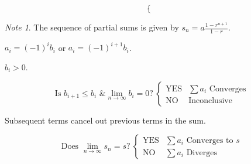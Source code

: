 \documentclass{article}
\theoremstyle{plain}
\numberwithin{theorem}{subsection}
\theoremstyle{definition}
\numberwithin{definition}{subsection}
\theoremstyle{remark}
\newtheorem{note}{Note}[section]
\numberwithin{note}{subsection}
\begin{document}
\begin{multicols}{2}
\begin{mdframed}[style=exampledefaultcols,frametitle={Geometric Series}]
\begin{equation*}
\begin{cases}
			\end{cases}
		\end{equation*}
	\end{mdframed}
	\begin{note}
		The sequence of partial sums is given by $\displaystyle s_n=a\frac{1-r^{n+1}}{1-r}$.
	\end{note}
	\begin{mdframed}[style=exampledefaultcols,frametitle={Alternating Series}]
		\begin{description}[style=sameline]
			\item[Form] $a_i = \left( -1 \right)^i b_i$ or $a_i = \left( -1 \right)^{i+1} b_i$.
			\item[Conditions] $b_i>0$.
		\end{description}
		\begin{equation*}
			\text{Is $b_{i+1}\leqslant b_i$ \& $\lim_{n\to\infty}b_i=0$?}\:
			\begin{cases}
				\text{YES} & \text{$\sum a_i$ Converges} \\
				\text{NO} & \text{Inconclusive}
			\end{cases}
		\end{equation*}
	\end{mdframed}
	\begin{mdframed}[style=exampledefaultcols,frametitle={Telescoping Series}]
		\begin{description}[style=sameline]
			\item[Conditions] Subsequent terms cancel out previous terms in the sum.
		\end{description}
		\begin{equation*}
			\text{Does $\lim_{n\to\infty}s_n=s$?}\:
			\begin{cases}
				\text{YES} & \text{$\sum a_i$ Converges to $s$} \\
				\text{NO} & \text{$\sum a_i$ Diverges}
			\end{cases}
		\end{equation*}
	\end{mdframed}
	\begin{mdframed}[style=exampledefaultcols,frametitle={Comparison Test}]
		\begin{description}[style=sameline]

\end{description}
\end{mdframed}
\end{multicols}
\end{document}
